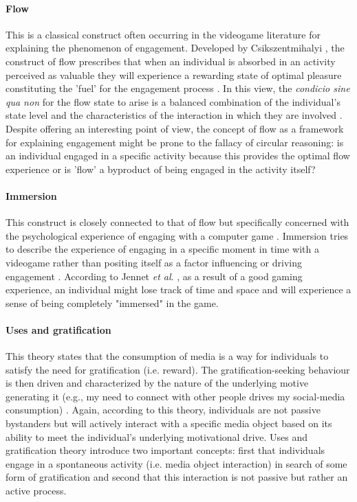 \paragraph*{Flow} This is a classical construct often occurring in the videogame literature for explaining the phenomenon of engagement. Developed by Csikszentmihalyi \cite{csikszentmihalyi2014toward}, the construct of flow prescribes that when an individual is absorbed in an activity perceived as valuable they will experience a rewarding state of optimal pleasure constituting the 'fuel' for the engagement process \cite{boyle2012engagement}. In this view, the \textit{condicio sine qua non} for the flow state to arise is a balanced combination of the individual’s state level and the characteristics of the interaction in which they are involved \cite{boyle2012engagement,csikszentmihalyi2014toward}. Despite offering an interesting point of view, the concept of flow as a framework for explaining engagement might be prone to the fallacy of circular reasoning: is an individual engaged in a specific activity because this provides the optimal flow experience or is 'flow' a byproduct of being engaged in the activity itself? 

\paragraph*{Immersion} This construct is closely connected to that of flow but specifically concerned with the psychological experience of engaging with a computer game \cite{jennett2008measuring}. Immersion tries to describe the experience of engaging in a specific moment in time with a videogame rather than positing itself as a factor influencing or driving engagement \cite{jennett2008measuring}. According to Jennet \textit{et al}. \cite{jennett2008measuring}, as a result of a good gaming experience, an individual might lose track of time and space and will experience a sense of being completely "immersed" in the game.

\paragraph*{Uses and gratification} This theory states that the consumption of media is a way for individuals to satisfy the need for gratification (i.e. reward). The gratification-seeking behaviour is then driven and characterized by the nature of the underlying motive generating it (e.g., my need to connect with other people drives my social-media consumption) \cite{lucas2004sex}. Again, according to this theory, individuals are not passive bystanders but will actively interact with a specific media object based on its ability to meet the individual's underlying motivational drive. Uses and gratification theory introduce two important concepts: first that individuals engage in a spontaneous activity (i.e. media object interaction) in search of some form of gratification and second that this interaction is not passive but rather an active process.

